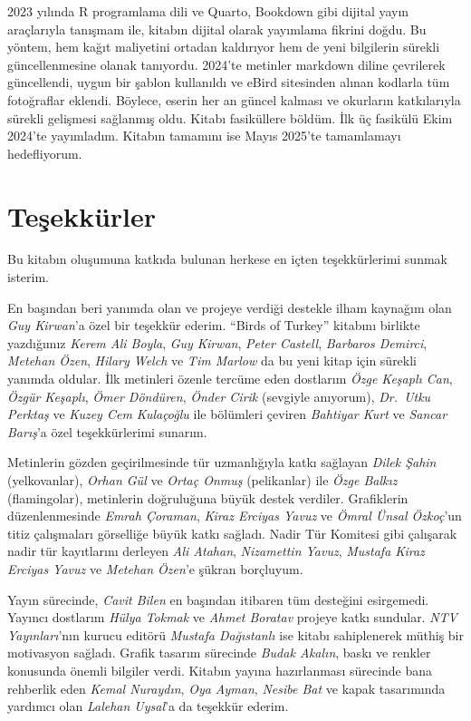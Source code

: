 \documentclass[
  a4paper,
  DIV=11,
  numbers=noendperiod]{scrreprt}
\begin{document}
2023 yılında R programlama dili ve Quarto, Bookdown gibi dijital yayın
araçlarıyla tanışmam ile, kitabın dijital olarak yayımlama fikrini
doğdu. Bu yöntem, hem kağıt maliyetini ortadan kaldırıyor hem de yeni
bilgilerin sürekli güncellenmesine olanak tanıyordu. 2024'te metinler
markdown diline çevrilerek güncellendi, uygun bir şablon kullanıldı ve
eBird sitesinden alınan kodlarla tüm fotoğraflar eklendi. Böylece,
eserin her an güncel kalması ve okurların katkılarıyla sürekli gelişmesi
sağlanmış oldu. Kitabı fasiküllere böldüm. İlk üç fasikülü Ekim 2024'te
yayımladım. Kitabın tamamını ise Mayıs 2025'te tamamlamayı hedefliyorum.

\section*{Teşekkürler}\label{teux15fekkuxfcrler}


Bu kitabın oluşumuna katkıda bulunan herkese en içten teşekkürlerimi
sunmak isterim.

En başından beri yanımda olan ve projeye verdiği destekle ilham kaynağım
olan \emph{Guy Kirwan}'a özel bir teşekkür ederim. ``Birds of Turkey''
kitabını birlikte yazdığımız \emph{Kerem Ali Boyla}, \emph{Guy Kirwan},
\emph{Peter Castell}, \emph{Barbaros Demirci}, \emph{Metehan Özen},
\emph{Hilary Welch} ve \emph{Tim Marlow} da bu yeni kitap için sürekli
yanımda oldular. İlk metinleri özenle tercüme eden dostlarım \emph{Özge
Keşaplı Can}, \emph{Özgür Keşaplı}, \emph{Ömer Döndüren}, \emph{Önder
Cirik} (sevgiyle anıyorum), \emph{Dr.~Utku Perktaş} ve \emph{Kuzey Cem
Kulaçoğlu} ile bölümleri çeviren \emph{Bahtiyar Kurt} ve \emph{Sancar
Barış}'a özel teşekkürlerimi sunarım.

Metinlerin gözden geçirilmesinde tür uzmanlığıyla katkı sağlayan
\emph{Dilek Şahin} (yelkovanlar), \emph{Orhan Gül} ve \emph{Ortaç Onmuş}
(pelikanlar) ile \emph{Özge Balkız} (flamingolar), metinlerin
doğruluğuna büyük destek verdiler. Grafiklerin düzenlenmesinde
\emph{Emrah Çoraman}, \emph{Kiraz Erciyas Yavuz} ve \emph{Ömral Ünsal
Özkoç}'un titiz çalışmaları görselliğe büyük katkı sağladı. Nadir Tür
Komitesi gibi çalışarak nadir tür kayıtlarını derleyen \emph{Ali
Atahan}, \emph{Nizamettin Yavuz}, \emph{Mustafa Kiraz Erciyas Yavuz} ve
\emph{Metehan Özen}'e şükran borçluyum.

Yayın sürecinde, \emph{Cavit Bilen} en başından itibaren tüm desteğini
esirgemedi. Yayıncı dostlarım \emph{Hülya Tokmak} ve \emph{Ahmet
Boratav} projeye katkı sundular. \emph{NTV Yayınları}'nın kurucu editörü
\emph{Mustafa Dağıstanlı} ise kitabı sahiplenerek müthiş bir motivasyon
sağladı. Grafik tasarım sürecinde \emph{Budak Akalın}, baskı ve renkler
konusunda önemli bilgiler verdi. Kitabın yayına hazırlanması sürecinde
bana rehberlik eden \emph{Kemal Nuraydın}, \emph{Oya Ayman},
\emph{Nesibe Bat} ve kapak tasarımında yardımcı olan \emph{Lalehan
Uysal}'a da teşekkür ederim.
\end{document}

